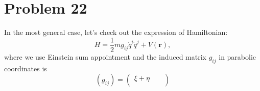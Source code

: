 \section*{Problem 22}

In the most general case, let's check out the expression of Hamiltonian:
\begin{equation}
    H = \frac{1}{2} m g_{ij} \dot{q}^i \dot{q}^j  +  V\left(\boldsymbol{r}\right),
\end{equation}
where we use Einstein sum appointment and the induced matrix $g_{ij}$ in parabolic coordinates is
\begin{equation}
    \left(g_{ij}\right)  = \left(
    \begin{matrix}
        \xi + \eta  &   &   \\
        
    \end{matrix}
    \right)
\end{equation}